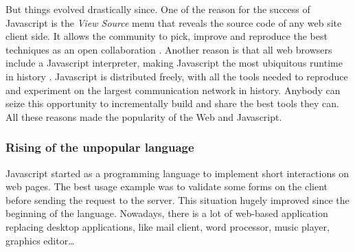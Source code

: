 But things evolved drastically since.
One of the reason for the success of Javascript is the \textit{View Source} menu that reveals the source code of any web site client side.
It allows the community to pick, improve and reproduce the best techniques as an open collaboration .
Another reason is that all web browsers include a Javascript interpreter, making Javascript the most ubiquitous runtime in history \cite{Flanagan2006}.
Javascript is distributed freely, with all the tools needed to reproduce and experiment on the largest communication network in history.
Anybody can seize this opportunity to incrementally build and share the best tools they can.
All these reasons made the popularity of the Web and Javascript.


\subsubsection{Rising of the unpopular language}

Javascript started as a programming language to implement short interactions on web pages.
The best usage example was to validate some forms on the client before sending the request to the server.
This situation hugely improved since the beginning of the language.
Nowadays, there is a lot of web-based application replacing desktop applications, like mail client, word processor, music player, graphics editor…

